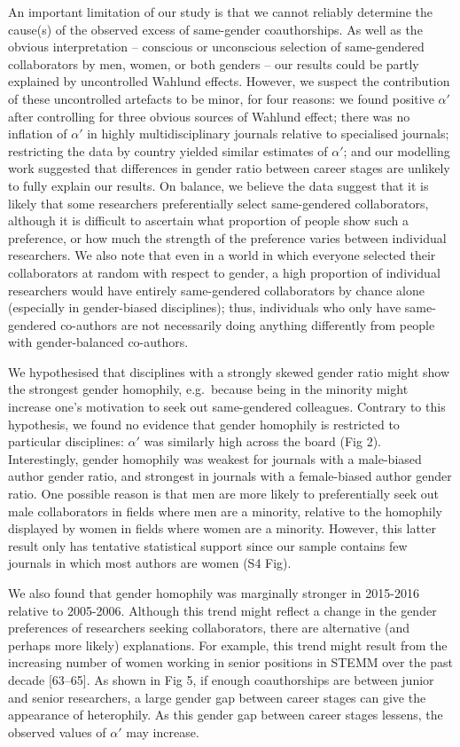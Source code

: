 \documentclass[12pt,]{article}
\begin{document}
An important limitation of our study is that we cannot reliably
determine the cause(s) of the observed excess of same-gender
coauthorships. As well as the obvious interpretation -- conscious or
unconscious selection of same-gendered collaborators by men, women, or
both genders -- our results could be partly explained by uncontrolled
Wahlund effects. However, we suspect the contribution of these
uncontrolled artefacts to be minor, for four reasons: we found positive
\(\alpha'\) after controlling for three obvious sources of Wahlund
effect; there was no inflation of \(\alpha'\) in highly
multidisciplinary journals relative to specialised journals; restricting
the data by country yielded similar estimates of \(\alpha'\); and our
modelling work suggested that differences in gender ratio between career
stages are unlikely to fully explain our results. On balance, we believe
the data suggest that it is likely that some researchers preferentially
select same-gendered collaborators, although it is difficult to
ascertain what proportion of people show such a preference, or how much
the strength of the preference varies between individual researchers. We
also note that even in a world in which everyone selected their
collaborators at random with respect to gender, a high proportion of
individual researchers would have entirely same-gendered collaborators
by chance alone (especially in gender-biased disciplines); thus,
individuals who only have same-gendered co-authors are not necessarily
doing anything differently from people with gender-balanced co-authors.

We hypothesised that disciplines with a strongly skewed gender ratio
might show the strongest gender homophily, e.g.~because being in the
minority might increase one's motivation to seek out same-gendered
colleagues. Contrary to this hypothesis, we found no evidence that
gender homophily is restricted to particular disciplines: \(\alpha'\)
was similarly high across the board (Fig 2). Interestingly, gender
homophily was weakest for journals with a male-biased author gender
ratio, and strongest in journals with a female-biased author gender
ratio. One possible reason is that men are more likely to preferentially
seek out male collaborators in fields where men are a minority, relative
to the homophily displayed by women in fields where women are a
minority. However, this latter result only has tentative statistical
support since our sample contains few journals in which most authors are
women (S4 Fig).

We also found that gender homophily was marginally stronger in 2015-2016
relative to 2005-2006. Although this trend might reflect a change in the
gender preferences of researchers seeking collaborators, there are
alternative (and perhaps more likely) explanations. For example, this
trend might result from the increasing number of women working in senior
positions in STEMM over the past decade {[}63--65{]}. As shown in Fig 5,
if enough coauthorships are between junior and senior researchers, a
large gender gap between career stages can give the appearance of
heterophily. As this gender gap between career stages lessens, the
observed values of \(\alpha'\) may increase.
\end{document}
